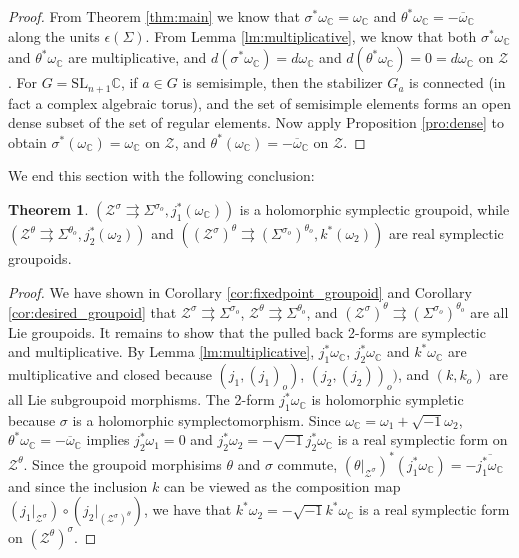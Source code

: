 \documentclass[a4paper,12pt,leqno]{amsart}
\numberwithin{equation}{section}
\theoremstyle{plain}
\theoremstyle{definition}
\newcommand{\SL}{\textrm{SL}}
\newcommand{\cZ}{\mathcal{Z}}
\newcommand{\bC}{\mathbb{C}}
\newtheorem{thm}{Theorem}[section]
\begin{document}
\begin{proof}
From Theorem \ref{thm:main} we know that  $\sigma^*\omega_\bC=\omega_\bC$ and $\theta^*\omega_\bC=-\overline{\omega}_\bC$ along the units $\epsilon(\Sigma)$. From Lemma \ref{lm:multiplicative}, we know that both $\sigma^*\omega_\bC$ and $\theta^*\omega_\bC$ are multiplicative, and $d(\sigma^*\omega_\bC)=d\omega_\bC$ and $d(\theta^*\omega_\bC)=0=d\omega_\bC$ on $\cZ$.  For $G=\SL_{n+1}\bC$, if $a\in G$ is semisimple, then the stabilizer $G_a$ is connected (in fact a complex algebraic torus), and the set of semisimple elements forms an open dense subset of the set of regular elements. Now apply Proposition \ref{pro:dense} to obtain $\sigma^*(\omega_\bC)=\omega_\bC$ on $\cZ$, and $\theta^*(\omega_\bC)=-\overline{\omega}_\bC$ on $\cZ$.
\end{proof}

We end this section with the following conclusion:

\begin{thm}\label{thm:result}
$ (\cZ^{\sigma} \rightrightarrows \Sigma^{\sigma_o}, j_1^*(\omega_\bC))$ is a holomorphic symplectic groupoid, while  
$ (\cZ^{\theta} \rightrightarrows \Sigma^{\theta_o}, j_2^*(\omega_2)) $ and $( (\cZ^{\sigma})^\theta \rightrightarrows (\Sigma^{\sigma_o})^{\theta_o}, k^*(\omega_2))$ are real symplectic groupoids.
\end{thm}
\begin{proof}
We have shown in Corollary \ref{cor:fixedpoint_groupoid} and Corollary \ref{cor:desired_groupoid} that $ \cZ^{\sigma} \rightrightarrows \Sigma^{\sigma_o}$, $ \cZ^{\theta} \rightrightarrows \Sigma^{\theta_o}$, and $(\cZ^{\sigma})^\theta \rightrightarrows (\Sigma^{\sigma_o})^{\theta_o}$ are all Lie groupoids. It remains to show that the pulled back 2-forms are symplectic and multiplicative. By Lemma \ref{lm:multiplicative}, $j_1^*\omega_\bC$, $j_2^*\omega_\bC$ and $k^*\omega_\bC$ are multiplicative and closed because $(j_1,(j_1)_o)$, $(j_2,(j_2))_o)$, and $(k,k_o)$ are all Lie subgroupoid morphisms. The 2-form $j_1^*\omega_\bC$ is holomorphic sympletic because $\sigma$ is a holomorphic symplectomorphism. Since $\omega_\bC=\omega_1+\sqrt{-1}\omega_2$, $\theta^*\omega_\bC=-\overline{\omega}_\bC$ implies $j_2^*\omega_1=0$ and $j_2^*\omega_2=-\sqrt{-1}j_2^*\omega_\bC$ is a real symplectic form on $\cZ^\theta$. Since the groupoid morphisims $\theta$ and $\sigma$ commute,  $(\theta|_{\cZ^\sigma})^*(j_1^*\omega_\bC)=-\overline{j_1^*\omega_\bC}$ and since the inclusion $k$ can be viewed as the composition map $(j_1|_{\cZ^\sigma})\circ (j_2|_{(\cZ^\sigma)^\theta})$, we have that $k^*\omega_2=-\sqrt{-1}k^*\omega_\bC$ is a real symplectic form on $(\cZ^\theta)^\sigma$.
\end{proof}
\end{document}
